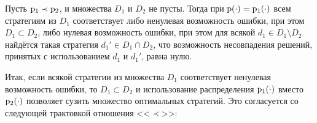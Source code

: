 \begin{theorem}
\label{theorem_zubyuk}
    Пусть ${\mathrm{p}}_1\prec{\mathrm{p}}_2$, и множества $D_1$ и $D_2$ не пусты. Тогда при ${\mathrm{p}}(\cdot) = {\mathrm{p}}_1(\cdot)$ всем стратегиям из $D_1$ соответствует либо ненулевая возможность ошибки, при этом $D_1\subset D_2$, либо нулевая возможность ошибки, при этом для всякой $d_1\in D_1\setminus D_2$ найдётся такая стратегия $d_1'\in  D_1\cap D_2$, что возможность несовпадения решений, принятых с использованием $d_1$ и $d_1'$, равна нулю.
\end{theorem}

Итак, если всякой стратегии из множества $D_1$ соответствует ненулевая возможность ошибки, то $D_1\subset D_2$ и использование распределения ${\mathrm{p}}_1(\cdot)$ вместо ${\mathrm{p}}_2(\cdot)$ позволяет сузить множество оптимальных стратегий. 
Это согласуется со следующей трактовкой отношения <<$\prec$>>: 
\begin{center}  \end{center}



	
